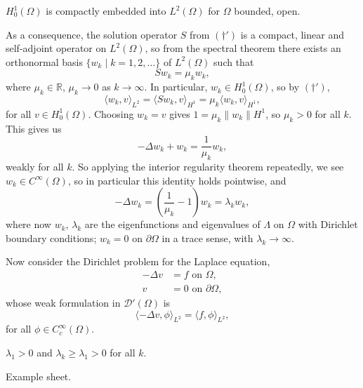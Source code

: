 \documentclass[12pt]{article}
\begin{document}
\begin{corollary}
	$H^1_0(\Omega)$ is compactly embedded into $L^2(\Omega)$ for $\Omega$ bounded, open.
\end{corollary}

As a consequence, the solution operator $S$ from $(\dagger')$ is a compact, linear and self-adjoint operator on $L^2(\Omega)$, so from the spectral theorem there exists an orthonormal basis $\{w_k \mid k = 1, 2, \ldots\}$ of $L^2(\Omega)$ such that
\[
S w_k = \mu_k w_k,
\]
where $\mu_k \in \mathbb{R}$, $\mu_k \to 0$ as $k \to \infty$. In particular, $w_k \in H^1_0(\Omega)$, so by $(\dagger')$,
\[
\langle w_k, v \rangle_{L^2} = \langle Sw_k, v \rangle_{H^1} = \mu_k \langle w_k, v\rangle_{H^1},
\]
for all $v \in H^1_0(\Omega)$. Choosing $w_k = v$ gives $1 = \mu_k \|w_k\|H^1$, so $\mu_k > 0$ for all $k$. This gives us
\[
- \Delta w_k + w_k = \frac{1}{\mu_k} w_k,
\]
weakly for all $k$. So applying the interior regularity theorem repeatedly, we see $w_k \in C^\infty(\Omega)$, so in particular this identity holds pointwise, and
\[
- \Delta w_k = \left( \frac{1}{\mu_k} - 1 \right) w_k = \lambda_k w_k,
\]
where now $w_k$, $\lambda_k$ are the eigenfunctions and eigenvalues of $\Lambda$ on $\Omega$ with Dirichlet boundary conditions; $w_k = 0$ on $\partial \Omega$ in a trace sense, with $\lambda_k \to \infty$.

Now consider the Dirichlet problem for the Laplace equation,
\begin{align*}
	- \Delta v &= f \text{ on } \Omega,  \tag{$\ast$}\\
	v &= 0 \text{ on } \partial \Omega,
\end{align*}
whose weak formulation in $\mathcal{D}'(\Omega)$ is
\[
\langle - \Delta v, \phi \rangle_{L^2} = \langle f, \phi \rangle_{L^2},
\]
for all $\phi \in C^\infty_c(\Omega)$.

\begin{theorem}
	$\lambda_1 > 0$ and $\lambda_k \geq \lambda_1 > 0$ for all $k$.
\end{theorem}

\begin{proofbox}
	Example sheet.
\end{proofbox}
\end{document}

